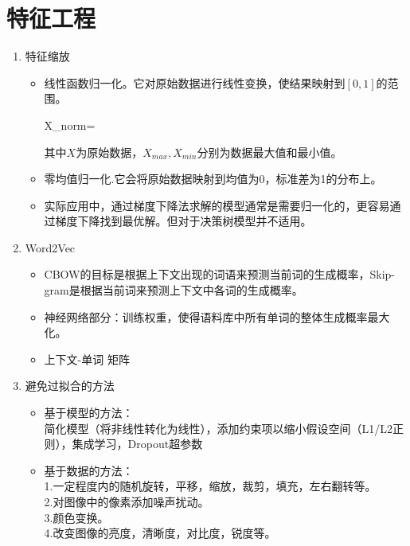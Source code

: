 \chapter{特征工程}
\setlength{\parskip}{6pt}
\begin{enumerate}
	\item 特征缩放
	\begin{itemize}
		\item 线性函数归一化。它对原始数据进行线性变换，使结果映射到$[0,1]$的范围。\\
		\begin{flalign}
			X_{norm}=
		\end{flalign}
		其中$X$为原始数据，$X_{max}, X_{min}$分别为数据最大值和最小值。
		\item 零均值归一化.它会将原始数据映射到均值为0，标准差为1的分布上。\\
		\item 实际应用中，通过梯度下降法求解的模型通常是需要归一化的，更容易通过梯度下降找到最优解。但对于决策树模型并不适用。\\
	\end{itemize}
	\item Word2Vec
	\begin{itemize}
		\item CBOW的目标是根据上下文出现的词语来预测当前词的生成概率，Skip-gram是根据当前词来预测上下文中各词的生成概率。
		\item 神经网络部分：训练权重，使得语料库中所有单词的整体生成概率最大化。
		\item 上下文-单词 矩阵
	\end{itemize}
	\item 避免过拟合的方法
	\begin{itemize}
		\item 基于模型的方法：\\
		 简化模型（将非线性转化为线性），添加约束项以缩小假设空间（L1/L2正则），集成学习，Dropout超参数
		\item 基于数据的方法：\\
		1.一定程度内的随机旋转，平移，缩放，裁剪，填充，左右翻转等。\\
		2.对图像中的像素添加噪声扰动。\\
		3.颜色变换。\\
		4.改变图像的亮度，清晰度，对比度，锐度等。\\
	\end{itemize}
\end{enumerate}
